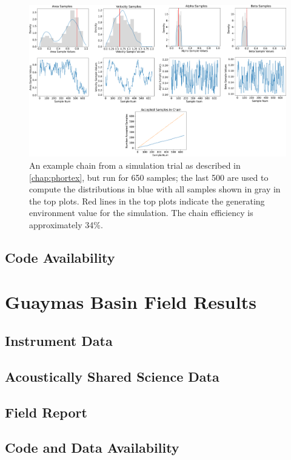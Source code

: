 \begin{figure}[h!]
    \centering
    \includegraphics[width=1\columnwidth]{figures/phumes_long_chain.png}
    \caption[\PHUMES long chain]{An example chain from a simulation trial as described in \cref{chap:phortex}, but run for 650 samples; the last 500 are used to compute the distributions in blue with all samples shown in gray in the top plots. Red lines in the top plots indicate the generating environment value for the simulation. The chain efficiency is approximately 34\%.}
    \label{fig:phumes_long_chain}
\end{figure}

\section{Code Availability}


\chapter{Guaymas Basin Field Results}

\section{Instrument Data}

\section{Acoustically Shared Science Data}

\section{Field Report}

\section{Code and Data Availability}
